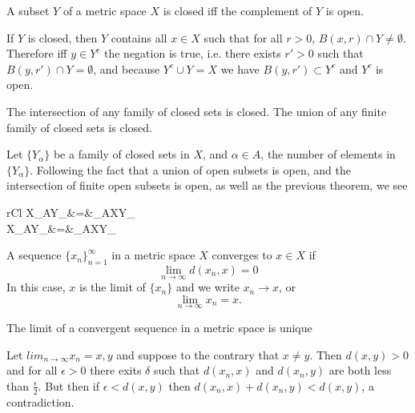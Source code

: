 \documentclass[nobib,notoc]{tufte-handout}
\begin{document}
\begin{thm}
	A subset \(Y\) of a metric space \(X\) is closed iff the complement of \(Y\) is open.
	\begin{IEEEproof}
		If \(Y\) is closed, then \(Y\) contains all \(x\in X\) such that for all \(r>0\), \(B(x,r)\cap Y\neq\emptyset\). Therefore iff \(y\in Y^c\) the negation is true, i.e. there exists \(r'>0\) such that \(B(y,r')\cap Y=\emptyset\), and because \(Y^c\cup Y=X\) we have \(B(y,r')\subset Y^c\) and \(Y^c\) is open.
	\end{IEEEproof}
\end{thm}
\begin{thm}
	The intersection of any family of closed sets is closed. The union of any finite family of closed sets is closed.
	\begin{IEEEproof}
		Let \(\{Y_\alpha\}\) be a family of closed sets in \(X\), and \(\alpha\in A\), the number of elements in \(\{Y_\alpha\}\). Following the fact that a union of open subsets is open, and the intersection of finite open subsets is open, as well as the previous theorem, we see
		\begin{IEEEeqnarray*}{rCl}
			X\setminus\bigcup_{\alpha\in A}Y_{\alpha}&=&\bigcap_{\alpha\in A}X\setminus Y_\alpha\\
			X\setminus\bigcap_{\alpha\in A}Y_{\alpha}&=&\bigcup_{\alpha\in A}X\setminus Y_\alpha
		\end{IEEEeqnarray*}
	\end{IEEEproof}
\end{thm}
\begin{defi}
	A sequence \(\{x_n\}_{n=1}^{\infty}\) in a metric space \(X\) converges to \(x\in X\) if
	\begin{equation*}
		\lim_{n\rightarrow\infty}d(x_n, x)=0
	\end{equation*}
	In this case, \(x\) is the limit of \(\{x_n\}\) and we write \(x_n\rightarrow x\), or
	\begin{equation*}
		\lim_{n\rightarrow\infty}x_n=x.
	\end{equation*}
\end{defi}
\begin{lem}
	The limit of a convergent sequence in a metric space is unique
	\begin{IEEEproof}
		Let \(lim_{n\rightarrow\infty}x_n=x,y\) and suppose to the contrary that \(x\neq y\). Then \(d(x,y)>0\) and for all \(\epsilon>0\) there exits \(\delta\) such that \(d(x_n,x)\) and \(d(x_n,y)\) are both less than \(\frac{\epsilon}{2}\). But then if \(\epsilon<d(x,y)\) then \(d(x_n,x)+d(x_n,y)<d(x,y)\), a contradiction.
	\end{IEEEproof}
\end{lem}
\end{document}

